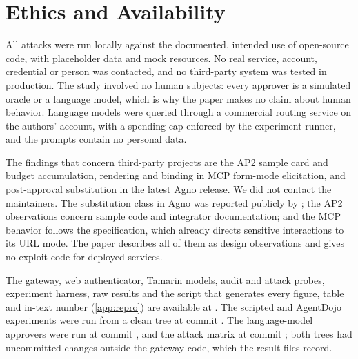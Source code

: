 \section*{Ethics and Availability}\label{sec:ethics}

All attacks were run locally against the documented, intended use of open-source code, with placeholder data and
mock resources. No real service, account, credential or person was contacted, and no third-party system was
tested in production. The study involved no human subjects: every approver is a simulated oracle or a language
model, which is why the paper makes no claim about human behavior. Language models were queried through a
commercial routing service on the authors' account, with a spending cap enforced by the experiment runner, and the
prompts contain no personal data.

The findings that concern third-party projects are the AP2 sample card and budget accumulation, rendering and
binding in MCP form-mode elicitation, and post-approval substitution in the latest Agno release. We did not
contact the maintainers. The substitution class in Agno was reported publicly by \citet{arunkumar2026loopjacking};
the AP2 observations concern sample code and integrator documentation; and the MCP behavior follows the
specification, which already directs sensitive interactions to its URL mode. The paper describes all of them as
design observations and gives no exploit code for deployed services.

The gateway, web authenticator, Tamarin models, audit and attack probes, experiment harness, raw results and the
script that generates every figure, table and in-text number (\cref{app:repro}) are available at
\codeurl{}. The scripted and AgentDojo experiments were run from a clean tree at commit . The
language-model approvers were run at commit , and the attack matrix at commit ; both
trees had uncommitted changes outside the gateway code, which the result files record.
